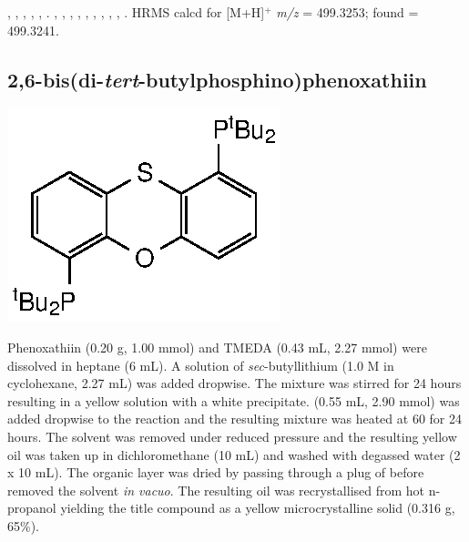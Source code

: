 ,
,
,
,
,
.
,
,
,
,
,
,
,
,
,
.
HRMS calcd for  [M+H]$^+$ \emph{m/z} = 499.3253; found = 499.3241.


\subsection*{2,6-bis(di-\emph{tert}-butylphosphino)phenoxathiin}

\begin{structure}[h]
\begin{center}
\includegraphics{../Structures/Transthixantphos.eps}
\end{center}
\end{structure}

Phenoxathiin (0.20 g, 1.00 mmol) and TMEDA (0.43 mL, 2.27 mmol) were dissolved in heptane (6 mL).  A solution of \emph{sec}-butyllithium (1.0 M in cyclohexane, 2.27 mL) was added dropwise.  The mixture was stirred for 24 hours resulting in a yellow solution with a white precipitate.   (0.55 mL, 2.90 mmol) was added dropwise to the reaction and the resulting mixture was heated at 60 \degC{}  for 24 hours.  The solvent was removed under reduced pressure and the resulting yellow oil was taken up in dichloromethane (10 mL) and washed with degassed water (2 x 10 mL).  The organic layer was dried by passing through a plug of  before removed the solvent \emph{in vacuo}.  The resulting oil was recrystallised from hot n-propanol yielding the title compound as a yellow microcrystalline solid (0.316 g, 65\%).  

